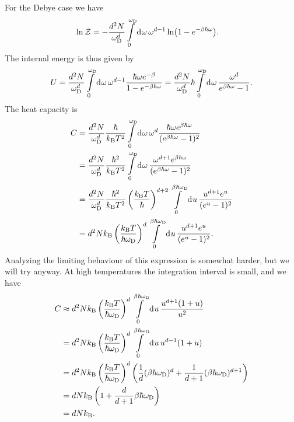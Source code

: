 For the Debye case we have
\begin{align*}
	\ln{\mathcal{Z}} &= -\frac{d^{2}N}{\omega_{\text{D}}^{d}}\int\limits_{0}^{\omega_{\text{D}}}\dd[]{\omega}\omega^{d - 1}\ln(1 - e^{-\beta\hbar\omega}).
\end{align*}
The internal energy is thus given by
\begin{align*}
	U = \frac{d^{2}N}{\omega_{\text{D}}^{d}}\int\limits_{0}^{\omega_{\text{D}}}\dd[]{\omega}\omega^{d - 1}\frac{\hbar\omega e^{-\beta}}{1 - e^{-\beta\hbar\omega}} = \frac{d^{2}N}{\omega_{\text{D}}^{d}}\hbar\int\limits_{0}^{\omega_{\text{D}}}\dd[]{\omega}\frac{\omega^{d}}{e^{\beta\hbar\omega} - 1}.
\end{align*}
The heat capacity is
\begin{align*}
	C &= \frac{d^{2}N}{\omega_{\text{D}}^{d}}\frac{\hbar}{k_{\text{B}} T^{2}}\int\limits_{0}^{\omega_{\text{D}}}\dd[]{\omega}\omega^{d}\frac{\hbar\omega e^{\beta\hbar\omega}}{(e^{\beta\hbar\omega} - 1)^{2}} \\
	  &= \frac{d^{2}N}{\omega_{\text{D}}^{d}}\frac{\hbar^{2}}{k_{\text{B}} T^{2}}\int\limits_{0}^{\omega_{\text{D}}}\dd[]{\omega}\frac{\omega^{d + 1} e^{\beta\hbar\omega}}{(e^{\beta\hbar\omega} - 1)^{2}} \\
	  &= \frac{d^{2}N}{\omega_{\text{D}}^{d}}\frac{\hbar^{2}}{k_{\text{B}} T^{2}}\left(\frac{k_{\text{B}} T}{\hbar}\right)^{d + 2}\int\limits_{0}^{\beta\hbar\omega_{\text{D}}}\dd[]{u}\frac{u^{d + 1} e^{u}}{(e^{u} - 1)^{2}} \\
	  &= d^{2}Nk_{\text{B}}\left(\frac{k_{\text{B}} T}{\hbar\omega_{\text{D}}}\right)^{d}\int\limits_{0}^{\beta\hbar\omega_{\text{D}}}\dd[]{u}\frac{u^{d + 1} e^{u}}{(e^{u} - 1)^{2}}.
\end{align*}
Analyzing the limiting behaviour of this expression is somewhat harder, but we will try anyway. At high temperatures the integration interval is small, and we have
\begin{align*}
	C &\approx d^{2}Nk_{\text{B}}\left(\frac{k_{\text{B}} T}{\hbar\omega_{\text{D}}}\right)^{d}\int\limits_{0}^{\beta\hbar\omega_{\text{D}}}\dd[]{u}\frac{u^{d + 1}(1 + u)}{u^{2}} \\
	  &= d^{2}Nk_{\text{B}}\left(\frac{k_{\text{B}} T}{\hbar\omega_{\text{D}}}\right)^{d}\int\limits_{0}^{\beta\hbar\omega_{\text{D}}}\dd[]{u}u^{d - 1}(1 + u) \\
	  &= d^{2}Nk_{\text{B}}\left(\frac{k_{\text{B}} T}{\hbar\omega_{\text{D}}}\right)^{d}\left(\frac{1}{d}(\beta\hbar\omega_{\text{D}})^{d} + \frac{1}{d + 1}(\beta\hbar\omega_{\text{D}})^{d + 1}\right) \\
	  &= dNk_{\text{B}}\left(1 + \frac{d}{d + 1}\beta\hbar\omega_{\text{D}}\right) \\
	  &= dNk_{\text{B}}.
\end{align*}
